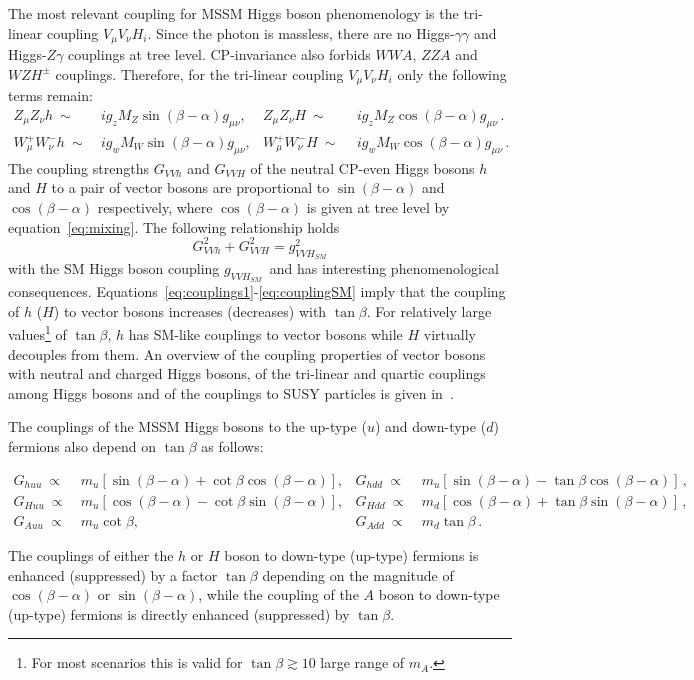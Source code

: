 The most relevant coupling for MSSM Higgs boson phenomenology is  the tri-linear coupling $V_{\mu}V_{\nu}H_i$.
Since the photon is massless, there are no Higgs-$\gamma\gamma$ and Higgs-$Z\gamma$ couplings at tree level. CP-invariance also forbids $WWA$, $ZZA$
and $WZH^{\pm}$ couplings. Therefore, for the tri-linear coupling $V_{\mu}V_{\nu}H_i$  only the following terms remain:
\begin{align} 
Z_{\mu}Z_{\nu} h ~ \sim  ~ & ig_z M_Z \sin(\beta -\alpha) g_{\mu\nu},  &  Z_{\mu}Z_{\nu} H ~ \sim ~  ~    & ig_z M_Z \cos(\beta -\alpha) g_{\mu\nu} \label{eq:couplings1}\,. \\ 
W_{\mu}^+W_{\nu}^- h ~\sim ~&  ig_w M_W \sin(\beta -\alpha) g_{\mu\nu},  &  W_{\mu}^+W_{\nu}^- H ~ \sim ~ ~ & ig_w M_W \cos(\beta -\alpha) g_{\mu\nu} \label{eq:couplings2} \,.
\end{align}
The coupling strengths $G_{VVh}$ and $G_{VVH}$ of the neutral CP-even Higgs bosons $h$ and $H$ to a pair of 
vector bosons are proportional to $\sin(\beta -\alpha)$ and $\cos(\beta -\alpha)$
respectively, where $\cos(\beta -\alpha)$ is given at tree level by equation~\eqref{eq:mixing}. 
The following relationship holds
\begin{equation}\label{eq:couplingSM}
G^2_{VVh} +G^2_{VVH} = g^2_{VVH_{SM} } 
\end{equation}
with the SM Higgs boson coupling  $g_{VVH_{SM}}\,$  and has interesting phenomenological consequences. 
Equations~\eqref{eq:couplings1}-\eqref{eq:couplingSM} imply that the coupling of $h$ ($H$) to  vector bosons 
increases (decreases) with $\tan\beta$. For relatively large values\footnote{For most scenarios this is valid for  $\tan\beta \apprge 10$ 
large range of $m_A$.} 
of $\tan\beta$, $h$ has SM-like couplings to vector bosons while  $H$ virtually decouples from them. An overview of the 
coupling properties of vector bosons with neutral and charged Higgs bosons, of the tri-linear and quartic couplings among Higgs bosons 
and of the couplings to SUSY particles is given in~\cite{Djuadi}.

The couplings of the MSSM Higgs bosons to the up-type ($u$) and down-type ($d$) fermions also depend on $\tan\beta$
as follows:
\begin{small}
\begin{align*}
G_{huu} ~\propto ~ & m_u [\sin(\beta - \alpha)  + \cot\beta \cos(\beta - \alpha)], & G_{hdd} ~\propto ~ & m_u [\sin(\beta - \alpha)  - \tan\beta \cos(\beta - \alpha)]\,,\\
G_{Huu} ~\propto ~& m_u [\cos(\beta - \alpha)  - \cot\beta \sin(\beta - \alpha)], & G_{Hdd} ~\propto~  & m_d [\cos(\beta - \alpha)  + \tan\beta \sin(\beta - \alpha)]\,,\\
G_{Auu} ~ \propto ~ & m_u  \cot\beta, & G_{Add} ~ \propto ~ & m_d \tan\beta \,.
\end{align*} 
\end{small}
The couplings of either the $h$ or $H$ boson to down-type (up-type) fermions is enhanced (suppressed) by a factor  $\tan\beta$ depending
on the magnitude of $\cos(\beta - \alpha)$ or $\sin(\beta - \alpha)$, while the coupling of the $A$ boson to down-type (up-type) fermions is directly 
enhanced (suppressed) by $\tan\beta$.


